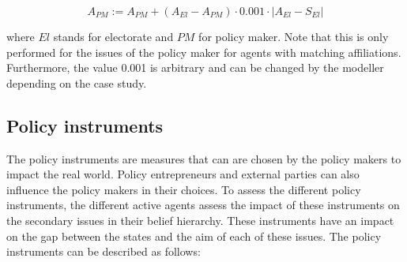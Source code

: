 \begin{equation}
A_{PM} := A_{PM} + \left(A_{El} - A_{PM} \right) \cdot 0.001 \cdot \left| A_{El} - S_{El} \right|
\end{equation}

where $El$ stands for electorate and $PM$ for policy maker. Note that this is only performed for the issues of the policy maker for agents with matching affiliations. Furthermore, the value 0.001 is arbitrary and can be changed by the modeller depending on the case study.

\subsection{Policy instruments}

The policy instruments are measures that can are chosen by the policy makers to impact the real world. Policy entrepreneurs and external parties can also influence the policy makers in their choices. To assess the different policy instruments, the different active agents assess the impact of these instruments on the secondary issues in their belief hierarchy. These instruments have an impact on the gap between the states and the aim of each of these issues. The policy instruments can be described as follows:

